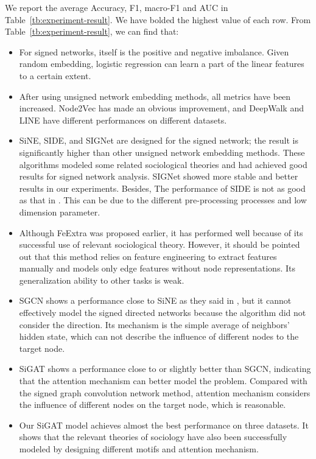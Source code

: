 \documentclass[runningheads]{llncs}
\begin{document}
We report the average Accuracy, F1, macro-F1 and AUC in Table~\ref{tb:experiment-result}. 
We have bolded the highest value of each row. From Table~\ref{tb:experiment-result}, we can find that:
\begin{itemize}
    \item For signed networks, itself is the positive and negative imbalance.
    Given random embedding, logistic regression can learn a part of the linear features to a certain extent.
    \item After using unsigned network embedding methods, all metrics have been increased. Node2Vec has made an obvious improvement, and DeepWalk and LINE have different performances on different datasets.  
    \item SiNE, SIDE, and SIGNet are designed for the signed network; the result is significantly higher than other unsigned network embedding methods. These algorithms modeled some related sociological theories and had achieved good results for signed network analysis. SIGNet showed more stable and better results in our experiments. Besides, The performance of SIDE is not as good as that in \cite{kim2018side}. This can be due to the different pre-processing processes and low dimension parameter. 
    \item  Although FeExtra was proposed earlier, it has performed well because of its successful use of relevant sociological theory. However, it should be pointed out that this method relies on feature engineering to extract features manually and models only edge features without node representations. Its generalization ability to other tasks is weak.
    \item SGCN shows a performance close to SiNE as they said in \cite{derr2018signed}, but it cannot effectively model the signed directed networks because the algorithm did not consider the direction. Its mechanism is the simple average of neighbors' hidden state, which can not describe the influence of different nodes to the target node. 
    \item SiGAT shows a performance close to or slightly better than SGCN, indicating that the attention mechanism can better model the problem. Compared with the signed graph convolution network method, attention mechanism considers the influence of different nodes on the target node, which is reasonable.
    \item Our SiGAT model achieves almost the best performance on three datasets. It shows that the relevant theories of sociology have also been successfully modeled by designing different motifs and attention mechanism.
\end{itemize}
\end{document}
